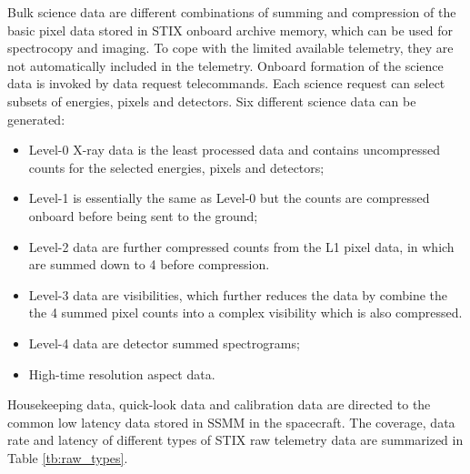 \documentclass{aa}
\begin{document}
Bulk science data are different combinations of summing and compression of the basic pixel data stored in STIX onboard archive memory, which can be used for spectrocopy and imaging.
To cope with the limited available telemetry, they are not automatically included in the telemetry.
Onboard formation of the science data is invoked by data request telecommands.
Each science request can select subsets of energies, pixels and detectors.
Six different science data can be generated:
\begin{itemize}
 \item Level-0 X-ray data is the least processed data and contains uncompressed counts for the selected energies, pixels and detectors;
\item Level-1 is essentially the same as Level-0 but the counts are compressed onboard before being sent to the ground;
\item Level-2 data are further compressed counts from the L1 pixel data, in which are summed down to 4 before compression.
\item Level-3 data are visibilities, which further reduces the data by combine the the 4 summed pixel counts into a complex visibility which is also compressed.
\item Level-4 data are detector summed spectrograms;
\item High-time resolution aspect data.
\end{itemize}
\begin{table}[h]
\centering
\caption{STIX raw telemetry data coverage, data rate and typical reception delay at SDC.  }
\label{tb:raw_types}
\end{table}

Housekeeping data, quick-look data and calibration data are directed to the
common low latency data stored in SSMM in the spacecraft.
The coverage, data rate and latency of
different types of STIX raw telemetry data are
summarized in Table \ref{tb:raw_types}.
\end{document}

